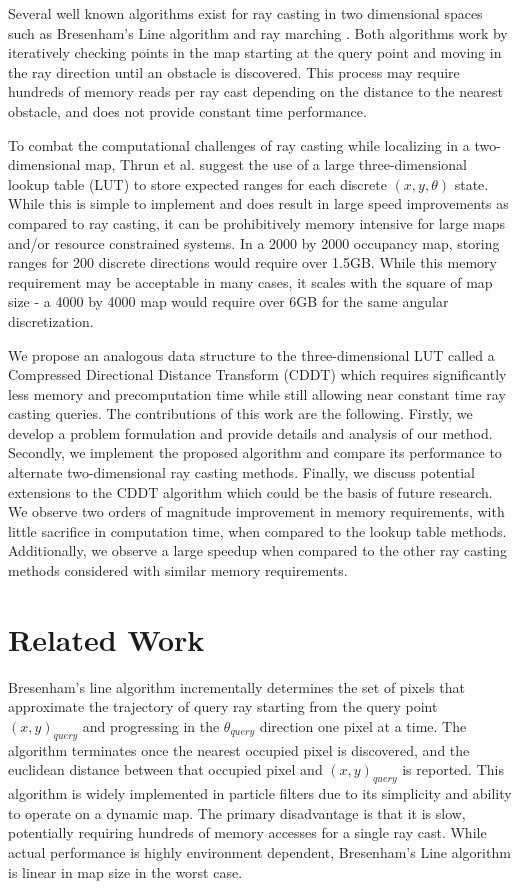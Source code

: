\documentclass[letterpaper, 10 pt, conference]{ieeeconf}  %
\begin{document}
Several well known algorithms exist for ray casting in two dimensional spaces such as Bresenham's Line algorithm \cite{bresenham} and ray marching \cite{raymarching}. Both algorithms work by iteratively checking points in the map starting at the query point and moving in the ray direction until an obstacle is discovered. This process may require hundreds of memory reads per ray cast depending on the distance to the nearest obstacle, and does not provide constant time performance. 

To combat the computational challenges of ray casting while localizing in a two-dimensional map, Thrun et al. \cite{localization} suggest the use of a large three-dimensional lookup table (LUT) to store expected ranges for each discrete $(x,y,\theta)$ state. While this is simple to implement and does result in large speed improvements as compared to ray casting, it can be prohibitively memory intensive for large maps and/or resource constrained systems. In a 2000 by 2000 occupancy map, storing ranges for 200 discrete directions would require over 1.5GB. While this memory requirement may be acceptable in many cases, it scales with the square of map size - a 4000 by 4000 map would require over 6GB for the same angular discretization.

We propose an analogous data structure to the three-dimensional LUT called a Compressed Directional Distance Transform (CDDT) which requires significantly less memory and precomputation time while still allowing near constant time ray casting queries. The contributions of this work are the following. Firstly, we develop a problem formulation and provide details and analysis of our method. Secondly, we implement the proposed algorithm and compare its performance to alternate two-dimensional ray casting methods. Finally, we discuss potential extensions to the CDDT algorithm which could be the basis of future research. We observe two orders of magnitude improvement in memory requirements, with little sacrifice in computation time, when compared to the lookup table methods. Additionally, we observe a large speedup when compared to the other ray casting methods considered with similar memory requirements.

\section{Related Work}

Bresenham's line algorithm \cite{bresenham} incrementally determines the set of pixels that approximate the trajectory of query ray starting from the query point $(x,y)_{query}$ and progressing in the $\theta_{query}$ direction one pixel at a time. The algorithm terminates once the nearest occupied pixel is discovered, and the euclidean distance between that occupied pixel and $(x,y)_{query}$ is reported. This algorithm is widely implemented in particle filters due to its simplicity and ability to operate on a dynamic map. The primary disadvantage is that it is slow, potentially requiring hundreds of memory accesses for a single ray cast. While actual performance is highly environment dependent, Bresenham’s Line algorithm is linear in map size in the worst case.
\end{document}
